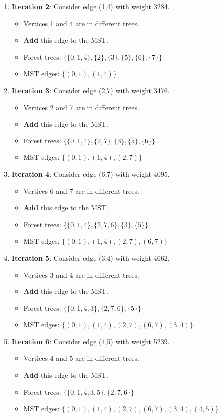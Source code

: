 \documentclass{article}
\theoremstyle{definition}
\begin{document}
\begin{enumerate}
\item \textbf{Iteration 2}: Consider edge (1,4) with weight 3284.
   \begin{itemize}
   \item Vertices 1 and 4 are in different trees.
   \item \textbf{Add} this edge to the MST.
   \item Forest trees: $\{\{0,1,4\}, \{2\}, \{3\}, \{5\}, \{6\}, \{7\}\}$
   \item MST edges: $\{(0,1), (1,4)\}$
   \end{itemize}

\item \textbf{Iteration 3}: Consider edge (2,7) with weight 3476.
   \begin{itemize}
   \item Vertices 2 and 7 are in different trees.
   \item \textbf{Add} this edge to the MST.
   \item Forest trees: $\{\{0,1,4\}, \{2,7\}, \{3\}, \{5\}, \{6\}\}$
   \item MST edges: $\{(0,1), (1,4), (2,7)\}$
   \end{itemize}

\item \textbf{Iteration 4}: Consider edge (6,7) with weight 4095.
   \begin{itemize}
   \item Vertices 6 and 7 are in different trees.
   \item \textbf{Add} this edge to the MST.
   \item Forest trees: $\{\{0,1,4\}, \{2,7,6\}, \{3\}, \{5\}\}$
   \item MST edges: $\{(0,1), (1,4), (2,7), (6,7)\}$
   \end{itemize}

\item \textbf{Iteration 5}: Consider edge (3,4) with weight 4662.
   \begin{itemize}
   \item Vertices 3 and 4 are in different trees.
   \item \textbf{Add} this edge to the MST.
   \item Forest trees: $\{\{0,1,4,3\}, \{2,7,6\}, \{5\}\}$
   \item MST edges: $\{(0,1), (1,4), (2,7), (6,7), (3,4)\}$
   \end{itemize}

\item \textbf{Iteration 6}: Consider edge (4,5) with weight 5239.
   \begin{itemize}
   \item Vertices 4 and 5 are in different trees.
   \item \textbf{Add} this edge to the MST.
   \item Forest trees: $\{\{0,1,4,3,5\}, \{2,7,6\}\}$
   \item MST edges: $\{(0,1), (1,4), (2,7), (6,7), (3,4), (4,5)\}$
   \end{itemize}


\end{enumerate}
\end{document}
